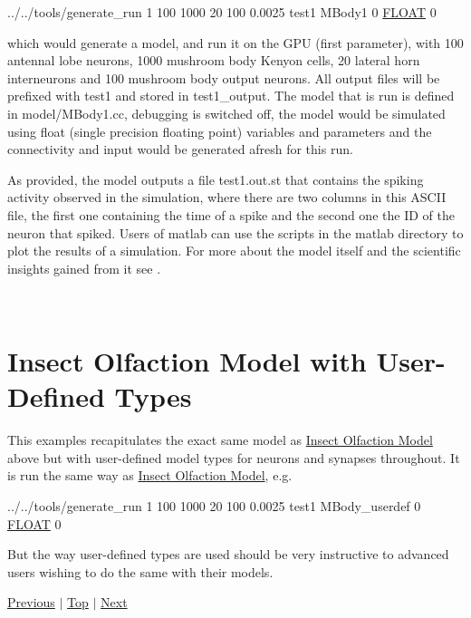 \begin{DoxyCode}
../../tools/generate\_run 1 100 1000 20 100 0.0025 test1 MBody1 0 \hyperlink{modelSpec_8h_ae8690abbffa85934d64d545920e2b108}{FLOAT} 0
\end{DoxyCode}
 which would generate a model, and run it on the G\+P\+U (first parameter), with 100 antennal lobe neurons, 1000 mushroom body Kenyon cells, 20 lateral horn interneurons and 100 mushroom body output neurons. All output files will be prefixed with {\ttfamily test1} and stored in {\ttfamily test1\+\_\+output}. The model that is run is defined in {\ttfamily model/\+M\+Body1.\+cc}, debugging is switched off, the model would be simulated using float (single precision floating point) variables and parameters and the connectivity and input would be generated afresh for this run.

As provided, the model outputs a file {\ttfamily test1.\+out.\+st} that contains the spiking activity observed in the simulation, where there are two columns in this A\+S\+C\+I\+I file, the first one containing the time of a spike and the second one the I\+D of the neuron that spiked. Users of matlab can use the scripts in the {\ttfamily matlab} directory to plot the results of a simulation. For more about the model itself and the scientific insights gained from it see \cite{nowotny2005self}.

~\newline
\hypertarget{Examples_ex_mbody_userdef}{}\section{Insect Olfaction Model with User-\/\+Defined Types}\label{Examples_ex_mbody_userdef}
This examples recapitulates the exact same model as \hyperlink{Examples_ex_mbody}{Insect Olfaction Model} above but with user-\/defined model types for neurons and synapses throughout. It is run the same way as \hyperlink{Examples_ex_mbody}{Insect Olfaction Model}, e.\+g. 
\begin{DoxyCode}
../../tools/generate\_run 1 100 1000 20 100 0.0025 test1 MBody\_userdef 0 \hyperlink{modelSpec_8h_ae8690abbffa85934d64d545920e2b108}{FLOAT} 0
\end{DoxyCode}
 But the way user-\/defined types are used should be very instructive to advanced users wishing to do the same with their models. 

 \hyperlink{Quickstart}{Previous} $\vert$ \hyperlink{Examples}{Top} $\vert$ \hyperlink{ReleaseNotes}{Next} 